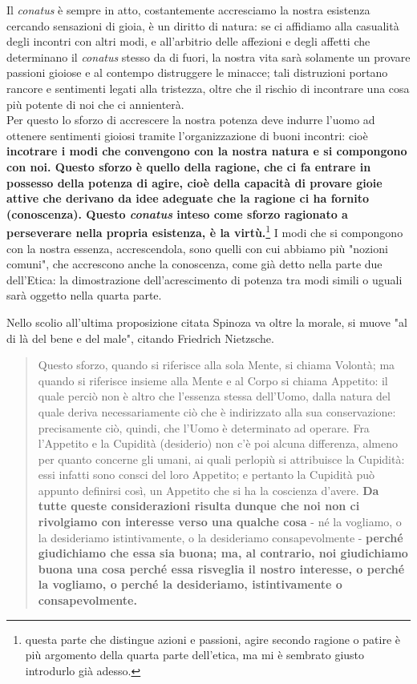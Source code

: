 Il \textit{conatus} è sempre in atto, costantemente accresciamo la nostra esistenza cercando sensazioni di gioia, è un diritto di natura: se ci affidiamo alla casualità degli incontri con altri modi, e all'arbitrio delle affezioni e degli affetti che determinano il \textit{conatus} stesso da di fuori, la nostra vita sarà solamente un provare passioni gioiose e al contempo distruggere le minacce; tali distruzioni portano rancore e sentimenti legati alla tristezza, oltre che il rischio di incontrare una cosa più potente di noi che ci annienterà.\\
Per questo lo sforzo di accrescere la nostra potenza deve indurre l'uomo ad ottenere sentimenti gioiosi tramite l'organizzazione di buoni incontri: cioè \textbf{incotrare i modi che convengono con la nostra natura e si compongono con noi. Questo sforzo è quello della ragione, che ci fa entrare in possesso della potenza di agire, cioè della capacità di provare gioie attive che derivano da idee adeguate che la ragione ci ha fornito (conoscenza). Questo \textit{conatus} inteso come sforzo ragionato a perseverare nella propria esistenza, è la virtù.}\footnote{questa parte che distingue azioni e passioni, agire secondo ragione o patire è più argomento della quarta parte dell'etica, ma mi è sembrato giusto introdurlo già adesso.} I modi che si compongono con la nostra essenza, accrescendola, sono quelli con cui abbiamo più "nozioni comuni", che accrescono anche la conoscenza, come già detto nella parte due dell'Etica: la dimostrazione dell'acrescimento di potenza tra modi simili o uguali sarà oggetto nella quarta parte.

Nello scolio all'ultima proposizione citata Spinoza va oltre la morale, si muove "al di là del bene e del male", citando Friedrich Nietzsche.

\begin{quotation}
	\small Questo sforzo, quando si riferisce alla sola Mente, si chiama Volontà; ma
	quando si riferisce insieme alla Mente e al Corpo si chiama Appetito: il quale perciò non è
	altro che l’essenza stessa dell’Uomo, dalla natura del quale deriva necessariamente ciò che
	è indirizzato alla sua conservazione: precisamente ciò, quindi, che l’Uomo è determinato
	ad operare. Fra l’Appetito e la Cupidità (desiderio) non c’è poi alcuna differenza, almeno per quanto
	concerne gli umani, ai quali perlopiù si attribuisce la Cupidità: essi infatti sono consci del loro Appetito; e pertanto la Cupidità può appunto definirsi così, un Appetito che si ha la
	coscienza d’avere. \textbf{Da tutte queste considerazioni risulta dunque che noi non ci rivolgiamo
		con interesse verso una qualche cosa} - né la vogliamo, o la desideriamo istintivamente, o la
	desideriamo consapevolmente - \textbf{perché giudichiamo che essa sia buona; ma, al contrario,
		noi giudichiamo buona una cosa perché essa risveglia il nostro interesse, o perché la vogliamo, o perché la desideriamo, istintivamente o consapevolmente.}
\end{quotation}

